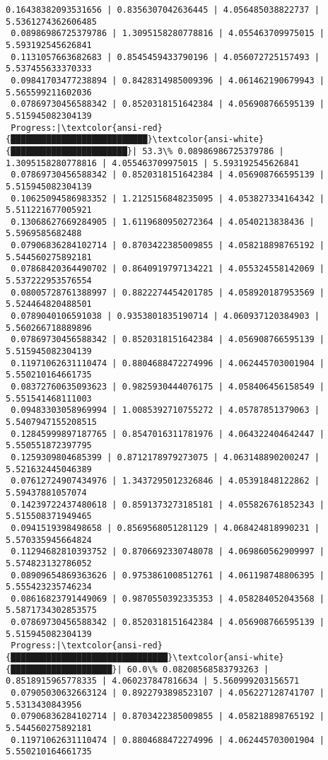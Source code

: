 \documentclass[11pt]{article}
\begin{document}
\begin{Verbatim}[commandchars=\\\{\}]
 0.16438382093531656 | 0.8356307042636445 | 4.056485038822737 | 5.5361274362606485
 0.08986986725379786 | 1.3095158280778816 | 4.055463709975015 | 5.593192545626841
 0.1131057663682683 | 0.8545459433790196 | 4.056072725157493 | 5.537455633370333
 0.09841703477238894 | 0.8428314985009396 | 4.061462190679943 | 5.565599211602036
 0.07869730456588342 | 0.8520318151642384 | 4.056908766595139 | 5.515945082304139
 Progress:|\textcolor{ansi-red}{███████████████████████████}\textcolor{ansi-white}{███████████████████████}| 53.3\% 0.08986986725379786 | 1.3095158280778816 | 4.055463709975015 | 5.593192545626841
 0.07869730456588342 | 0.8520318151642384 | 4.056908766595139 | 5.515945082304139
 0.10625094586983352 | 1.2125156848235095 | 4.053827334164342 | 5.511221677005921
 0.13068627669284905 | 1.6119680950272364 | 4.0540213838436 | 5.5969585682488
 0.07906836284102714 | 0.8703422385009855 | 4.058218898765192 | 5.544560275892181
 0.07868420364490702 | 0.8640919797134221 | 4.055324558142069 | 5.537222953576554
 0.08005728761388997 | 0.8822274454201785 | 4.058920187953569 | 5.524464820488501
 0.0789040106591038 | 0.9353801835190714 | 4.060937120384903 | 5.560266718889896
 0.07869730456588342 | 0.8520318151642384 | 4.056908766595139 | 5.515945082304139
 0.11971062631110474 | 0.8804688472274996 | 4.062445703001904 | 5.550210164661735
 0.08372760635093623 | 0.9825930444076175 | 4.058406456158549 | 5.551541468111003
 0.09483303058969994 | 1.0085392710755272 | 4.05787851379063 | 5.5407947155208515
 0.12845999897187765 | 0.8547016311781976 | 4.064322404642447 | 5.550551872397795
 0.1259309804685399 | 0.8712178979273075 | 4.063148890200247 | 5.521632445046389
 0.07612724907434976 | 1.3437295012326846 | 4.05391848122862 | 5.59437881057074
 0.14239722437480618 | 0.8591373273185181 | 4.055826761852343 | 5.515508371949465
 0.0941519398498658 | 0.8569568051281129 | 4.068424818990231 | 5.570335945664824
 0.11294682810393752 | 0.8706692330748078 | 4.069860562909997 | 5.574823132786052
 0.08909654869363626 | 0.9753861008512761 | 4.061198748806395 | 5.555423235746234
 0.08616823791449069 | 0.9870550392335353 | 4.058284052043568 | 5.5871734302853575
 0.07869730456588342 | 0.8520318151642384 | 4.056908766595139 | 5.515945082304139
 Progress:|\textcolor{ansi-red}{███████████████████████████████}\textcolor{ansi-white}{████████████████████}| 60.0\% 0.08208568583793263 | 0.8518915965778335 | 4.060237847816634 | 5.560999203156571
 0.07905030632663124 | 0.8922793898523107 | 4.056227128741707 | 5.5313430843956
 0.07906836284102714 | 0.8703422385009855 | 4.058218898765192 | 5.544560275892181
 0.11971062631110474 | 0.8804688472274996 | 4.062445703001904 | 5.550210164661735

\end{Verbatim}
\end{document}
